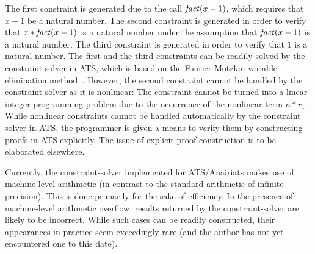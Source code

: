 The first constraint is generated due to the call ${\it fact} (x-1)$, which
requires that $x-1$ be a natural number. The second constraint is generated
in order to verify that $x * {\it fact} (x-1)$ is a natural number under
the assumption that ${\it fact} (x-1)$ is a natural number.  The third
constraint is generated in order to verify that $1$ is a natural number.
The first and the third constraints can be readily solved by the constraint
solver in ATS, which is based on the Fourier-Motzkin variable elimination
method~\cite{DE73}. However, the second constraint cannot be handled by the
constraint solver as it is nonlinear: The constraint cannot be turned into
a linear integer programming problem due to the occurrence of the nonlinear
term $n*r_1$.  While nonlinear constraints cannot be handled automatically
by the constraint solver in ATS, the programmer is given a means to verify
them by constructing proofs in ATS explicitly. The issue of explicit proof
construction is to be elaborated elsewhere.

Currently, the constraint-solver implemented for ATS/Anairiats makes use of
machine-level arithmetic (in contrast to the standard arithmetic of
infinite precision). This is done primarily for the sake of efficiency. In
the presence of machine-level arithmetic overflow, results returned by the
constraint-solver are likely to be incorrect. While such cases can be readily
constructed, their appearances in practice seem exceedingly rare (and the
author has not yet encountered one to this date).

